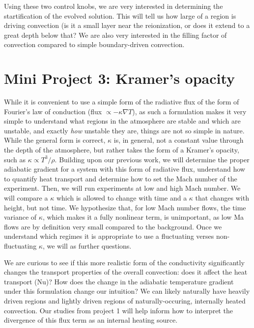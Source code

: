 \documentclass[aps, pre, onecolumn, nofootinbib, notitlepage, groupedaddress, amsfonts, amssymb, amsmath, longbibliography]{revtex4-1}
\newcommand{\grad}{\ensuremath{\nabla}}
\begin{document}
Using these two control knobs, we are very interested in determining the startification of the evolved
solution.  This will tell us how large of a region is driving convection (is it a small layer 
near the reionization, or does it extend to a great depth below that?  We are also very interested
in the filling factor of convection compared to simple boundary-driven convection.


\section{Mini Project 3: Kramer's opacity}
While it is convenient to use a simple form of the radiative flux of the form of
Fourier's law of conduction (flux $\propto -\kappa \grad T$), as such a formulation
makes it very simple to understand what regions in the atmosphere are stable and which
are unstable, and exactly \emph{how} unstable they are, things are not so simple in nature.
While the general form is correct, $\kappa$ is, in general, not a constant value through the
depth of the atmosphere, but rather takes the form of a Kramer's opacity, such as 
$\kappa \propto T^3 / \rho$. Building upon our previous work, we will determine the proper
adiabatic gradient for a system with this form of radiative flux, understand how to quantify
heat transport and determine how to set the Mach number of the experiment.  Then, we will run experiments 
at low and high Mach number.  We will compare a $\kappa$ which is allowed to change with time
and a $\kappa$ that changes with height, but not time.  We hypothesize that, for low Mach number
flows, the time variance of $\kappa$, which makes it a fully nonlinear term, is unimportant, as
low Ma flows are by definition very small compared to the background.  Once we understand which
regimes it is appropriate to use a fluctuating verses non-fluctuating $\kappa$, we will
as further questions.

We are curious to see if this more realistic form of the conductivity significantly changes
the transport properties of the overall convection: does it affect the heat transport
(Nu)?  How does the change in the adiabatic temperature gradient under this formulation
change our intuition?  We can likely naturally have heavily driven regions and lightly
driven regions of naturally-occuring, internally heated convection.  Our studies from project
1 will help inform how to interpret the divergence of this flux term as an internal heating
source.
\end{document}
